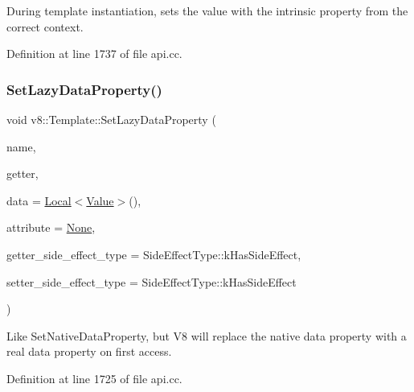 During template instantiation, sets the value with the intrinsic property from the correct context. 

Definition at line 1737 of file api.\+cc.

\mbox{\label{classv8_1_1Template_ab306ba858f4e71a25ebba4380ea5791f}} 
\subsubsection{\texorpdfstring{Set\+Lazy\+Data\+Property()}{SetLazyDataProperty()}}
{\footnotesize\ttfamily void v8\+::\+Template\+::\+Set\+Lazy\+Data\+Property (\begin{DoxyParamCaption}\item[{\mbox{\hyperlink{classv8_1_1Local}{v8\+::\+Local}}$<$ \mbox{\hyperlink{classv8_1_1Name}{Name}} $>$}]{name,  }\item[{Accessor\+Name\+Getter\+Callback}]{getter,  }\item[{\mbox{\hyperlink{classv8_1_1Local}{v8\+::\+Local}}$<$ \mbox{\hyperlink{classv8_1_1Value}{Value}} $>$}]{data = {\ttfamily \mbox{\hyperlink{classv8_1_1Local}{Local}}$<$\mbox{\hyperlink{classv8_1_1Value}{Value}}$>$()},  }\item[{\mbox{\hyperlink{namespacev8_a05f25f935e108a1ea2d150e274602b87}{Property\+Attribute}}}]{attribute = {\ttfamily \mbox{\hyperlink{namespacev8_a05f25f935e108a1ea2d150e274602b87a7ab4d58719c33b3ea2dfaefa29b111df}{None}}},  }\item[{\mbox{\hyperlink{namespacev8_a29711319c2b9fc7716d65faee2f7b9cb}{Side\+Effect\+Type}}}]{getter\+\_\+side\+\_\+effect\+\_\+type = {\ttfamily SideEffectType\+:\+:kHasSideEffect},  }\item[{\mbox{\hyperlink{namespacev8_a29711319c2b9fc7716d65faee2f7b9cb}{Side\+Effect\+Type}}}]{setter\+\_\+side\+\_\+effect\+\_\+type = {\ttfamily SideEffectType\+:\+:kHasSideEffect} }\end{DoxyParamCaption})}

Like Set\+Native\+Data\+Property, but V8 will replace the native data property with a real data property on first access. 

Definition at line 1725 of file api.\+cc.

\mbox{\label{classv8_1_1Template_a771f6ca09e5c4789306f8638de5b99ed}} 
